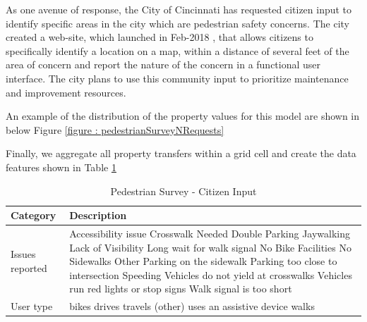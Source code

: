 \documentclass{llncs}
\begin{document}
As one avenue of response, the City of Cincinnati has requested citizen input to identify specific areas in the city which are pedestrian safety concerns. The city created a web-site, which launched in Feb-2018 \cite{cvg2018city}, that allows citizens to specifically identify a location on a map, within a distance of several feet of the area of concern and report the nature of the concern in a functional user interface. The city plans to use this community input to prioritize maintenance and improvement resources.

An example of the distribution of the property values for this model are shown in below Figure \ref{figure : pedestrianSurveyNRequests}

Finally, we aggregate all property transfers within a grid cell and create the data features shown in Table \ref{table : pedestrianSurvey} 


\FloatBarrier
\begin{table}[!h]
\begin{center}
\caption{Pedestrian Survey - Citizen Input}
\label{table : pedestrianSurvey}
\begin{tabular}{ p{} p{}}
\hline
\rule{0pt}{12pt}
Category		& Description	\\
\hline
Issues reported	&	Accessibility issue	\newline
		Crosswalk Needed	\newline
		Double Parking	\newline
		Jaywalking	\newline
		Lack of Visibility	\newline
		Long wait for walk signal	\newline
		No Bike Facilities	\newline
		No Sidewalks	\newline
		Other	\newline
		Parking on the sidewalk	\newline
		Parking too close to intersection	\newline
		Speeding	\newline
		Vehicles do not yield at crosswalks	\newline
		Vehicles run red lights or stop signs	\newline
		Walk signal is too short	\\
User type	&	bikes	\newline
		drives	\newline
		travels (other)	\newline
		uses an assistive device	\newline
		walks	\\[2pt]

\hline
\end{tabular}
\end{center}
\end{table}
\FloatBarrier
%
\end{document}
